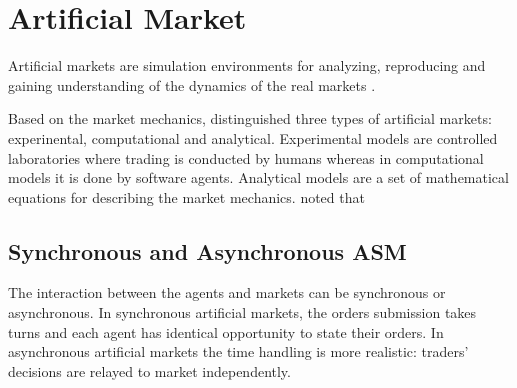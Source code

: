 \section{Artificial Market}
Artificial markets are simulation environments for analyzing, 
reproducing and gaining understanding of the dynamics of the 
real markets \citet{Julien07}. 

Based on the market mechanics, \citet{boer05} distinguished 
three types of artificial markets: experinental, computational and analytical. 
Experimental models are controlled laboratories 
where trading is conducted by humans whereas in computational
models it is done by software agents. Analytical models are a
set of mathematical equations for describing the market
mechanics. \citet{boer05} noted that 

\subsection{Synchronous and Asynchronous ASM}

The interaction between the agents and markets can be synchronous
or asynchronous. In synchronous artificial markets, the orders
submission takes turns and each agent has identical opportunity
to state their orders. In asynchronous artificial markets
the time handling is more realistic: traders' decisions are 
relayed to market independently. \citep{Julien07} 

